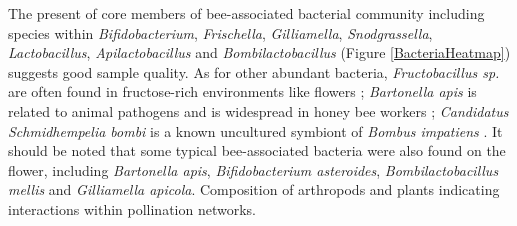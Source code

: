 \documentclass[11pt]{article}
\begin{document}
    The present of core members of bee-associated bacterial community including species within \textit{Bifidobacterium}, \textit{Frischella}, \textit{Gilliamella}, \textit{Snodgrassella}, \textit{Lactobacillus}, \textit{Apilactobacillus} and \textit{Bombilactobacillus} (Figure \ref{BacteriaHeatmap}) \citep{koch2011bacterial,moran2015genomics,kwong2017dynamic,zheng2020taxonomic} suggests good sample quality. 
    As for other abundant bacteria, \textit{Fructobacillus sp.} are often found in fructose-rich environments like flowers \citep{endo2014genus}; \textit{Bartonella apis} is related to animal pathogens \citep{kevsnerova2016bartonella} and is widespread in honey bee workers \citep{raymann2018role}; \textit{Candidatus Schmidhempelia bombi} is a known uncultured symbiont of \textit{Bombus impatiens} \citep{martinson2014genomic}. 
    It should be noted that some typical bee-associated bacteria were also found on the flower, including \textit{Bartonella apis}, \textit{Bifidobacterium asteroides}, \textit{Bombilactobacillus mellis} and \textit{Gilliamella apicola}. 
    \newline
    Composition of arthropods and plants indicating interactions within pollination networks. 
\end{document}
